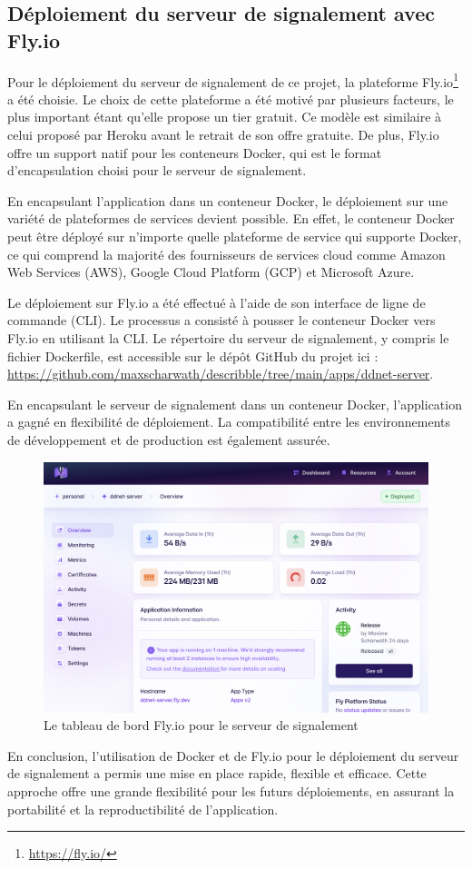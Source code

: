 \subsection{Déploiement du serveur de signalement avec Fly.io}

Pour le déploiement du serveur de signalement de ce projet, la plateforme Fly.io\footnote{\url{https://fly.io/}} a été choisie. Le choix de cette plateforme a été motivé par plusieurs facteurs, le plus important étant qu'elle propose un tier gratuit. Ce modèle est similaire à celui proposé par Heroku avant le retrait de son offre gratuite. De plus, Fly.io offre un support natif pour les conteneurs Docker, qui est le format d'encapsulation choisi pour le serveur de signalement.

En encapsulant l'application dans un conteneur Docker, le déploiement sur une variété de plateformes de services devient possible. En effet, le conteneur Docker peut être déployé sur n'importe quelle plateforme de service qui supporte Docker, ce qui comprend la majorité des fournisseurs de services cloud comme Amazon Web Services (AWS), Google Cloud Platform (GCP) et Microsoft Azure.

Le déploiement sur Fly.io a été effectué à l'aide de son interface de ligne de commande (CLI). Le processus a consisté à pousser le conteneur Docker vers Fly.io en utilisant la CLI. Le répertoire du serveur de signalement, y compris le fichier Dockerfile, est accessible sur le dépôt GitHub du projet ici : \url{https://github.com/maxscharwath/describble/tree/main/apps/ddnet-server}.

En encapsulant le serveur de signalement dans un conteneur Docker, l'application a gagné en flexibilité de déploiement. La compatibilité entre les environnements de développement et de production est également assurée.

\begin{figure}[ht]
    \centering
    \includegraphics[width=\textwidth]{assets/figures/fly.io.png}
    \caption{Le tableau de bord Fly.io pour le serveur de signalement}
    \label{fig:flyio-dashboard}
\end{figure}

En conclusion, l'utilisation de Docker et de Fly.io pour le déploiement du serveur de signalement a permis une mise en place rapide, flexible et efficace. Cette approche offre une grande flexibilité pour les futurs déploiements, en assurant la portabilité et la reproductibilité de l'application.